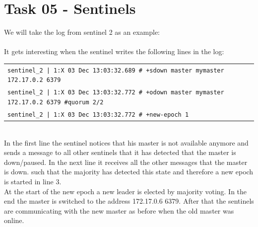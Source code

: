 \documentclass{article}
\begin{document}
	\section*{Task 05 - Sentinels}
	\begin{adjustwidth}{2em}{2em}
		We will take the log from sentinel 2 as an example: \\
		\hfill \\
		It gets interesting when the sentinel writes the following lines in the log:
		\begin{adjustwidth}{-4em}{-4em}
		\begin{center}
			\begin{tabular}{|l|}
			\hline
			\texttt{sentinel\_2  | 1:X 03 Dec 13:03:32.689 \# +sdown master mymaster 172.17.0.2 6379} \\
			\texttt{sentinel\_2  | 1:X 03 Dec 13:03:32.772 \# +odown master mymaster 172.17.0.2 6379 \#quorum 2/2} \\
			\texttt{sentinel\_2  | 1:X 03 Dec 13:03:32.772 \# +new-epoch 1} \\
			\hline
			\end{tabular}
		\end{center}
		\end{adjustwidth}
		\hfill \\
		In the first line the sentinel notices that his master is not available anymore and sends a message to all other sentinels that it has detected that the master is down/paused. In the next line it receives all the other messages that the master is down. such that the majority has detected this state and therefore a new epoch is started in line 3. \\
		At the start of the new epoch a new leader is elected by majority voting. In the end the master is switched to the address 172.17.0.6 6379. After that the sentinels are communicating with the new master as before when the old master was online.
	\end{adjustwidth}
\end{document}
